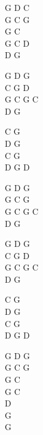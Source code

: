 \begin{chord}
    G D C\\
    G C G\\
    G C\\
    G C D\\
    D G
 
    G D G \\
    C G D\\
    G C G C\\
    D G

    C G\\
    D G \\
    C G \\
    D G D

    G D G\\
    G C G\\
    G C G C\\
    D G

    G D G \\
    C G D\\
    G C G C\\
    D G

    C G\\
    D G \\
    C G \\
    D G D

    G D G\\
    G C G\\
    G C\\
    G C \\
    D\\
    G\\
    G
\end{chord}